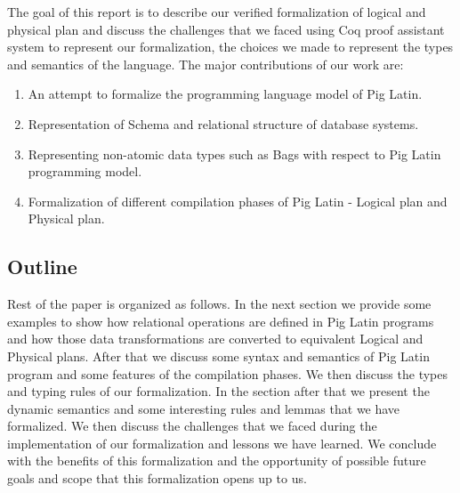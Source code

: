 The goal of this report is to describe our verified formalization of logical and physical plan and discuss the challenges that we faced using Coq proof assistant system to represent our formalization, the choices we made to represent the types and semantics of the language.
The major contributions of our work are:
\begin{enumerate}
	\item An attempt to formalize the programming language model of Pig Latin.
	\item Representation of Schema and relational structure of database systems.
	\item Representing non-atomic data types such as Bags with respect to Pig Latin programming model.
	\item Formalization of different compilation phases of Pig Latin - Logical plan and Physical plan.
\end{enumerate}

\subsection{Outline}
\label{subsec:outline}

Rest of the paper is organized as follows. In the next section we provide some examples to show how relational operations are defined in Pig Latin programs and how those data transformations are converted to equivalent Logical and Physical plans. After that we discuss some syntax and semantics of Pig Latin program and some features of the compilation phases. We then discuss the types and typing rules of our formalization. In the section after that 
we present the dynamic semantics and some interesting rules and lemmas that we have formalized. We then discuss the challenges that we faced during the implementation of our formalization and lessons we have learned. We conclude with the benefits of this formalization and the opportunity of possible future goals and scope that this formalization opens up to us.




